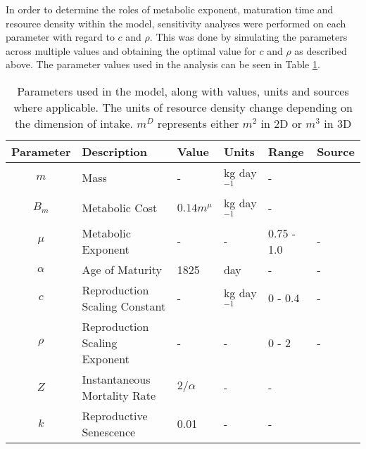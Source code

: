 \documentclass[a4paper, 11pt, hidelinks]{article} %
\begin{document}
	In order to determine the roles of metabolic exponent, maturation time and resource density within the model, sensitivity analyses were performed on each parameter with regard to $c$ and $\rho$.  This was done by simulating the parameters across multiple values and obtaining the optimal value for $c$ and $\rho$ as described above.
	The parameter values used in the analysis can be seen in Table \ref{parameters}.
	
	\begin{centering}
		
	
		
		\begin{table}[h!]
			
			\caption{Parameters used in the model, along with values, units and sources where applicable.  The units of resource density change depending on the dimension of intake.  $m^D$ represents either $m^2$ in 2D or $m^3$ in 3D} 
			\label{parameters}
			\vspace{2mm}
			{\RaggedRight %
			\begin{tabular}{c p{3.9cm} l l l p{3cm}}
				\hline
				Parameter 	& Description 			& Value 	& Units 	& Range 		& Source \\
				\hline
				$m$			& Mass					& -			& kg day$^{-1}$& -			&		\\
				
				$B_m$		& Metabolic Cost		& $0.14 m^{\mu}$ & kg day$^{-1}$& - 	& \cite{Peters1983}\\
				$\mu$		& Metabolic Exponent	& -			&	-		& 0.75 - 1.0	& - \\
				$\alpha$	& Age of Maturity		& 1825     	& day		& -				& -\\
				$c$			& Reproduction Scaling Constant & - & kg day$^{-1}$& 0 - 0.4 		& -\\
				$\rho$		& Reproduction Scaling Exponent	& -	&	-		& 0 - 2			& -\\
				$Z$			& Instantaneous Mortality Rate& $2/\alpha$	& -&-& \cite{Charnov2001}\\%
				$k$			& Reproductive Senescence & 0.01	& -			& -				\\
				

\end{tabular}}
\end{table}
\end{centering}
\end{document}
